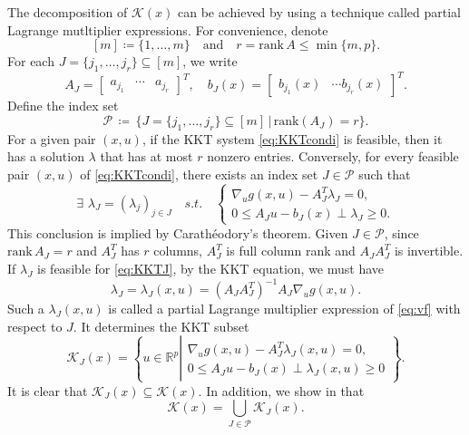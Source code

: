 \documentclass{amsart}
\theoremstyle{plain}
\newcommand{\re}{\mathbb{R}}
\newcommand{\st}{\mathit{s.t.}}
\newcommand{\mc}[1]{\mathcal{#1}}
\newcommand{\bbm}{\begin{bmatrix}}
\newcommand{\ebm}{\end{bmatrix}}
\numberwithin{equation}{section}
\begin{document}
    The decomposition of $\mc{K}(x)$ can be achieved by using 
        a technique called partial Lagrange mutltiplier expressions. 
        For convenience, denote
	\[
	[m]\coloneqq \{1,\ldots,m\}\quad \mbox{and}\quad 
        r = \mbox{rank}\, A\le\min\{m,p\}.
	\]
    For each $J = \{j_1,\ldots, j_r\}\subseteq [m]$, we write
        \begin{equation}\label{eq:AJbJ}
	A_J = \bbm a_{j_1} & \cdots & a_{j_r}\ebm^T,\quad
	b_J(x) = \bbm b_{j_1}(x) & \cdots b_{j_r}(x)\ebm^T.
	\end{equation}
        Define the index set
	\begin{equation}\label{eq:P}
		\mc{P}\,\coloneqq\, 
		\{J = \{j_1,\ldots, j_r\}\subseteq [m]\,\vert\, \mbox{rank}(A_J) = r\}.
	\end{equation}
	For a given pair $(x,u)$, if the KKT system \eqref{eq:KKTcondi} is feasible, 
	then it has a solution $\lambda$ that has at most $r$ nonzero entries. 
	Conversely, for every feasible pair $(x,u)$ of \eqref{eq:KKTcondi}, 
        there exists an index set $J\in\mc{P}$ such that 
	\begin{equation}\label{eq:KKTJ}
	\exists\,\, \lambda_J = (\lambda_j)_{j\in J}\quad \st\quad
	\left\{\begin{array}{l}
		\nabla_u g(x,u) - A_J^T\lambda_J = 0,\\
		0\le A_Ju-b_J(x)\perp \lambda_J\ge 0.
		\end{array}
	\right.
	\end{equation}
        This conclusion is implied by Carath\'{e}odory's theorem. 
        Given $J\in \mc{P}$, since $\mbox{rank}\, A_J = r$ and $A_J^T$ has $r$ columns,
        $A_J^T$ is full column rank and $A_JA_J^T$ is invertible.
        If $\lambda_J$ is feasible for \eqref{eq:KKTJ}, by the KKT equation,
        we must have
        \[ \lambda_J = \lambda_J(x,u) = (A_JA_J^{T})^{-1}A_J\nabla_u g(x,u). \]
        Such a $\lambda_J(x,u)$ is called a partial Lagrange multiplier
        expression of \eqref{eq:vf} with respect to $J$. It determines the KKT subset
        \[ 
        \mc{K}_J(x) = \left\{u\in\re^p\left\vert
        \begin{array}{c}
        \nabla_u g(x,u)-A_J^T\lambda_J(x,u) = 0,\\
        0\le A_Ju-b_J(x)\perp \lambda_J(x,u)\ge 0
        \end{array}\right.\right\}. 
        \]
        It is clear that $\mc{K}_J(x)\subseteq \mc{K}(x)$.
	In addition, we show in  that
	\[ 
	\mc{K}(x) = \bigcup_{J\in \mc{P}}\mc{K}_J(x).\]
\end{document}
